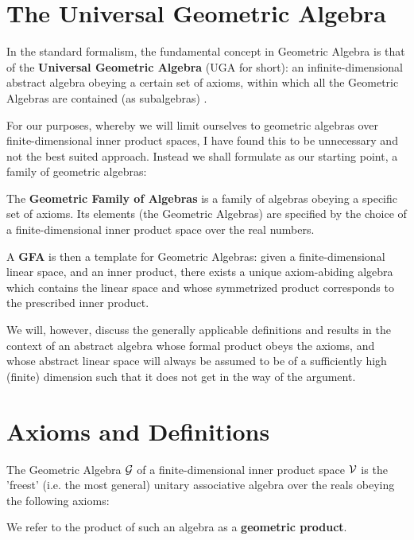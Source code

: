 \section{The Universal Geometric Algebra}\label{s:uga}

In the standard formalism, the fundamental concept in Geometric Algebra is that of the \textbf{Universal Geometric Algebra} (UGA for short): an infinite-dimensional abstract algebra obeying a certain set of axioms, within which all the Geometric Algebras are contained (as subalgebras) \cite{ga-origin}. 

For our purposes, whereby we will limit ourselves to geometric algebras over finite-dimensional inner product spaces, I have found this to be unnecessary and not the best suited approach. Instead we shall formulate as our starting point, a family of geometric algebras:
\begin{definition}
	The \textbf{Geometric Family of Algebras} is a family of algebras obeying a specific set of axioms. Its elements (the Geometric Algebras) are specified by the choice of a finite-dimensional inner product space over the real numbers.
\end{definition}

A \textbf{GFA} is then a template for Geometric Algebras: given a finite-dimensional linear space, and an inner product, there exists a unique axiom-abiding algebra which contains the linear space and whose symmetrized product corresponds to the prescribed inner product.

We will, however, discuss the generally applicable definitions and results in the context of an abstract algebra whose formal product obeys the axioms, and whose abstract linear space will always be assumed to be of a sufficiently high (finite) dimension such that it does not get in the way of the argument.

\newpage

\section{Axioms and Definitions}\label{s:axioms-definitions}

The Geometric Algebra $\mathcal{G}$ of a finite-dimensional inner product space $\mathcal{V}$ is the 'freest' (i.e. the most general) unitary associative algebra over the reals obeying the following axioms:

We refer to the product of such an algebra as a \textbf{geometric product}.

